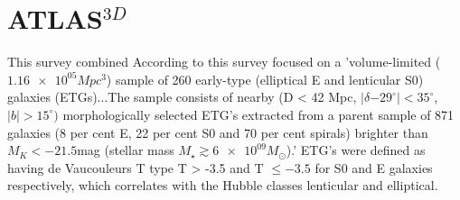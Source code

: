 \section{ATLAS$^{3D}$}
This survey combined 
According to \cite{Cappellari2011}
this survey focused on a 'volume-limited ($\num{1.16e05} Mpc^{3}$) sample of 260 early-type (elliptical E and lenticular S0) galaxies (ETGs)...The sample consists of nearby (D < 42 Mpc, $|\delta \num{-29}^{\circ}| < 35^{\circ}$, $|b| > 15^{\circ})$ morphologically selected ETG's extracted from a parent sample of 871 galaxies (8 per cent E, 22 per cent S0 and
70 per cent spirals) brighter than $M_{K} <\num{-21.5} $mag (stellar mass $M_{\star} \gtrsim \num{6e09} M_{\odot}$).' ETG's were defined as having de Vaucouleurs T type T > -3.5 and T $\leq -3.5$ for S0 and E galaxies respectively, which correlates with the Hubble classes lenticular and elliptical.


